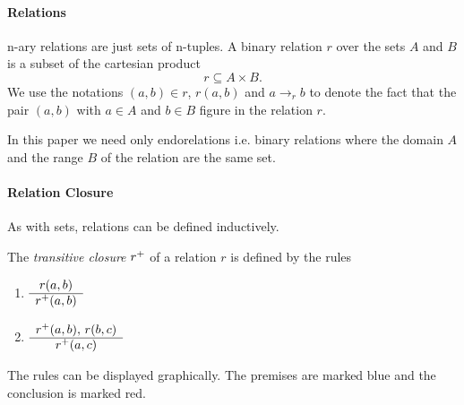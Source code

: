 \paragraph{Relations}

n-ary relations are just sets of n-tuples. A binary relation $r$ over the sets
$A$ and $B$ is a subset of the cartesian product
$$
    r \subseteq A \times B.
$$ We use the notations $(a,b) \in r$, $r(a,b)$ and $a \to_r b$ to denote the
fact that the pair $(a,b)$ with $a \in A$ and $b \in B$ figure in the relation
$r$.

In this paper we need only endorelations i.e. binary relations where the
domain $A$ and the range $B$ of the relation are the same set.




\paragraph{Relation Closure}

As with sets, relations can be defined inductively.


\begin{definition} The \emph{transitive closure} $r^+$ of a relation $r$ is
  defined by the rules
  \begin{enumerate}
  \item $\begin{array}{c} r(a,b) \\ \hline r^+(a,b)\end{array}$
  \item $\begin{array}{c} r^+(a,b),\, r(b,c) \\ \hline r^+(a,c)\end{array}$
  \end{enumerate}
\end{definition}

The rules can be displayed graphically. The premises are marked blue and the
conclusion is marked red.



